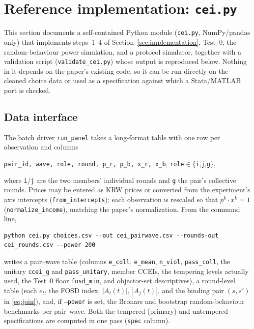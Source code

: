 \documentclass[11pt]{article}
\theoremstyle{remark}
\begin{document}
\section{Reference implementation: \texttt{cei.py}}\label{sec:code}

This section documents a self-contained Python module (\texttt{cei.py}, NumPy/pandas only) that implements steps~1--4 of Section~\ref{sec:implementation}, Test~0, the random-behaviour power simulation, and a protocol simulator, together with a validation script (\texttt{validate\_cei.py}) whose output is reproduced below. Nothing in it depends on the paper's existing code, so it can be run directly on the cleaned choice data or used as a specification against which a Stata/MATLAB port is checked.

\subsection{Data interface}

The batch driver \texttt{run\_panel} takes a long-format table with one row per observation and columns
\begin{center}
\texttt{pair\_id, wave, role, round, p\_r, p\_b, x\_r, x\_b}, \qquad \texttt{role}$\in\{$\texttt{i},\texttt{j},\texttt{g}$\}$,
\end{center}
where \texttt{i}/\texttt{j} are the two members' individual rounds and \texttt{g} the pair's collective rounds. Prices may be entered as KRW prices or converted from the experiment's axis intercepts (\texttt{from\_intercepts}); each observation is rescaled so that $p^k\cdot x^k=1$ (\texttt{normalize\_income}), matching the paper's normalization. From the command line,
\begin{lstlisting}
python cei.py choices.csv --out cei_pairwave.csv --rounds-out cei_rounds.csv --power 200
\end{lstlisting}
writes a pair--wave table (columns \texttt{e\_coll}, \texttt{e\_mean}, \texttt{n\_viol}, \texttt{pass\_coll}, the unitary \texttt{ccei\_g} and \texttt{pass\_unitary}, member CCEIs, the tempering levels actually used, the Test~0 floor \texttt{fosd\_min}, and objector-set descriptives), a round-level table (each $e_t$, the FOSD index, $|A_i(t)|$, $|A_j(t)|$, and the binding pair $(s,s')$ in \eqref{eq:join}), and, if \texttt{--power} is set, the Bronars and bootstrap random-behaviour benchmarks per pair--wave. Both the tempered (primary) and untempered specifications are computed in one pass (\texttt{spec} column).
\end{document}
